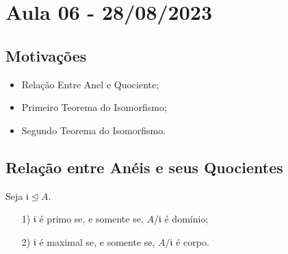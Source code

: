 \documentclass[AlgebraII/algebraII_notes.tex]{subfiles}
\begin{document}
\section{Aula 06 - 28/08/2023}
\subsection{Motivações}
\begin{itemize}
	\item Relação Entre Anel e Quociente;
	\item Primeiro Teorema do Isomorfismo;
	\item Segundo Teorema do Isomorfismo.
\end{itemize}
\subsection{Relação entre Anéis e seus Quocientes}
\begin{prop*}
	Seja \(\mathfrak{i}\trianglelefteq{A}.\)
	\begin{itemize}
		\item[1)] \(\mathfrak{i}\) é primo se, e somente se, \(A/\mathfrak{i}\) é domínio;
		\item[2)] \(\mathfrak{i}\) é maximal se, e somente se, \(A/\mathfrak{i}\) é corpo.
	\end{itemize}
\end{prop*}
\end{document}
